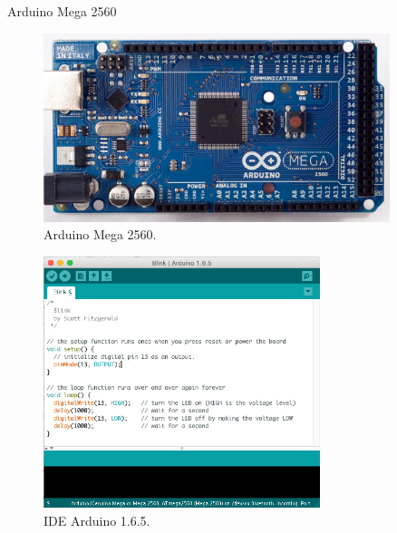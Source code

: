 	\begin{frame}{Arduino Mega 2560}
		\begin{figure}[p]
			\centering
			\includegraphics[width=0.9\textwidth]{img/arduino/arduinomega.jpg}
			\caption{Arduino Mega 2560.}
			\label{fig:arduinoHardware}
		\end{figure}
	\end{frame}
	\begin{frame}%
		\begin{figure}[p]
			\centering
			\includegraphics[width=0.72\textwidth]{img/arduino/ide.png}
			\caption{IDE Arduino 1.6.5.}
			\label{fig:arduinoHardware}
		\end{figure}
	\end{frame}
